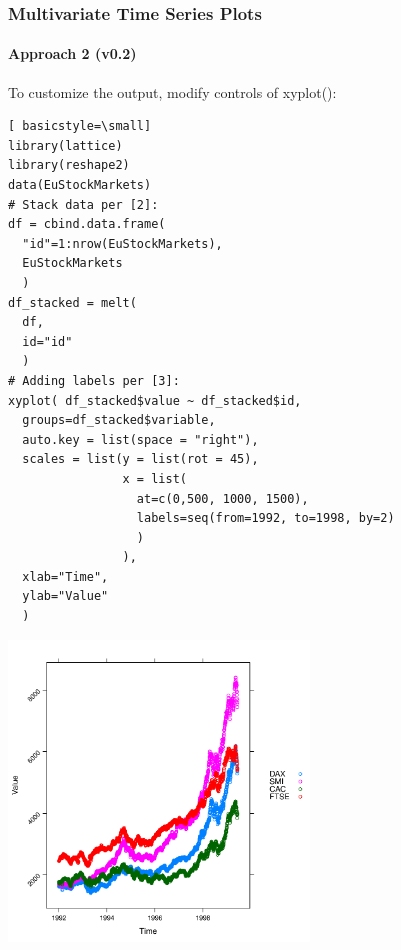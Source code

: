 \begin{frame}
 \frametitle{Multivariate Time Series Plots}
 \framesubtitle{Approach 2 (v0.2)}

To customize the output, modify controls of \ttfamily xyplot()\normalfont :

    \begin{lstlisting}[ basicstyle=\small]
library(lattice)
library(reshape2)   
data(EuStockMarkets)
# Stack data per [2]:
df = cbind.data.frame(
  "id"=1:nrow(EuStockMarkets),
  EuStockMarkets
  )
df_stacked = melt(
  df,
  id="id"
  )
# Adding labels per [3]:
xyplot( df_stacked$value ~ df_stacked$id, 
  groups=df_stacked$variable,
  auto.key = list(space = "right"),
  scales = list(y = list(rot = 45),
                x = list(
                  at=c(0,500, 1000, 1500),
                  labels=seq(from=1992, to=1998, by=2)
                  )
                ),
  xlab="Time",
  ylab="Value"
  )
    \end{lstlisting}
       \begin{center}
         \includegraphics[width=0.6\textwidth]{images/stockPlot1.pdf}
        \end{center}
\end{frame}

